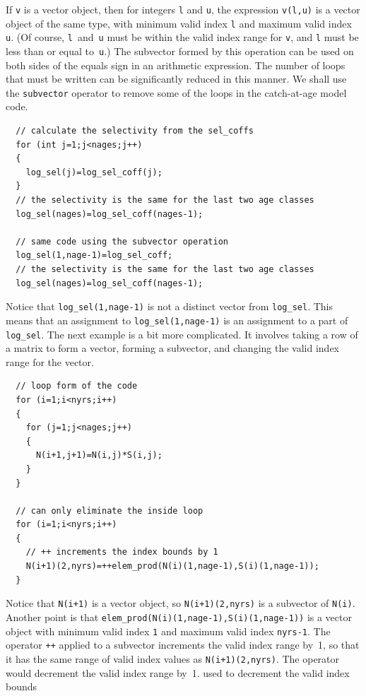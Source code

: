 \documentclass{admbmanual}
\begin{document}
If \texttt{v} is a vector object, then for integers \texttt{l} and \texttt{u},
the expression \texttt{v(l,u)} is a vector object of the same type, with minimum
valid index \texttt{l} and maximum valid index \texttt{u}. (Of course,
\texttt{l}~and~\texttt{u} must be within the valid index range for \texttt{v},
and \texttt{l} must be less than or equal to~\texttt{u}.) The subvector formed
by this operation can be used on both sides of the equals sign in an arithmetic
expression. The number of loops that must be written can be significantly
reduced in this manner. We shall use the \texttt{subvector} operator to remove
some of the loops in the catch-at-age model code.
\begin{lstlisting}
  // calculate the selectivity from the sel_coffs
  for (int j=1;j<nages;j++)
  {
    log_sel(j)=log_sel_coff(j);
  }
  // the selectivity is the same for the last two age classes
  log_sel(nages)=log_sel_coff(nages-1);

  // same code using the subvector operation
  log_sel(1,nage-1)=log_sel_coff;
  // the selectivity is the same for the last two age classes
  log_sel(nages)=log_sel_coff(nages-1);
\end{lstlisting}
Notice that \texttt{log\_sel(1,nage-1)} is not a distinct vector from
\texttt{log\_sel}. This means that an assignment to \texttt{log\_sel(1,nage-1)}
is an assignment to a part of \texttt{log\_sel}. The next example is a bit more
complicated. It involves taking a row of a matrix to form a vector, forming a
subvector, and changing the valid index range for the vector.
\begin{lstlisting}
  // loop form of the code
  for (i=1;i<nyrs;i++)
  {
    for (j=1;j<nages;j++)
    {
      N(i+1,j+1)=N(i,j)*S(i,j);
    }
  }

  // can only eliminate the inside loop
  for (i=1;i<nyrs;i++)
  {
    // ++ increments the index bounds by 1
    N(i+1)(2,nyrs)=++elem_prod(N(i)(1,nage-1),S(i)(1,nage-1));
  }
\end{lstlisting}
Notice that \texttt{N(i+1)} is a vector object, so \texttt{N(i+1)(2,nyrs)} is a
subvector of \texttt{N(i)}. Another point is that
\texttt{elem\_prod(N(i)(1,nage-1),S(i)(1,nage-1))} is a vector object with
minimum valid index \texttt{1} and maximum valid index \texttt{nyrs-1}. The
operator \texttt{++} applied to a subvector increments the valid index range
by~1, so that it has the same range of valid index values as
\texttt{N(i+1)(2,nyrs)}. The operator  would decrement
the valid index range by~1.
%
{used to decrement the valid index bounds}
\end{document}
